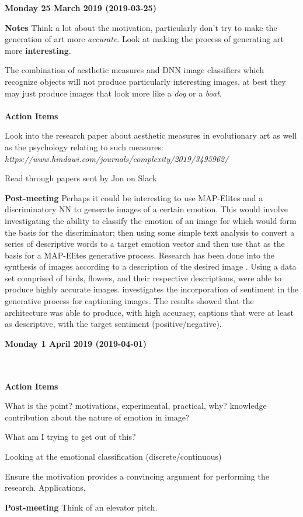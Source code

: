 \documentclass[10pt,a4paper]{article}
\begin{document}
	\begin{center} \textbf{Monday 25 March 2019 (2019-03-25)} \end{center} 
	
	\textbf{Notes}
	Think a lot about the motivation, particularly don't try to make the generation of art more \textit{accurate}. Look at making the process of generating art more \textbf{interesting}.
	
	The combination of aesthetic measures and DNN image classifiers which recognize objects will not produce particularly interesting images, at best they may just produce images that look more like a \textit{dog} or a \textit{boat}.
	\\\\
	\textbf{Action Items}
	\begin{todolist}
		\item Look into the research paper about aesthetic measures in evolutionary art as well as the psychology relating to such measures:\\
		\textit{https://www.hindawi.com/journals/complexity/2019/3495962/}
		\item Read through papers sent by Jon on Slack
	\end{todolist}
	\textbf{Post-meeting}
	Perhaps it could be interesting to use MAP-Elites and a discriminatory NN to generate images of a certain emotion. This would involve investigating the ability to classify the emotion of an image for which would form the basis for the discriminator; then using some simple text analysis to convert a series of descriptive words to a target emotion vector and then use that as the basis for a MAP-Elites generative process.
	Research has been done into the synthesis of images according to a description of the desired image \citep{reed2016generative}.
	Using a data set comprised of birds, flowers, and their respective descriptions, \citet{reed2016generative} were able to produce highly accurate images.
	\citet{mathews2016senticap} investigates the incorporation of sentiment in the generative process for captioning images.
	The results showed that the architecture was able to produce, with high accuracy, captions that were at least as descriptive, with the target sentiment (positive/negative).
	
	\begin{center} \textbf{Monday 1 April 2019 (2019-04-01)} \end{center} 
	
	\\\\
	\textbf{Action Items}
	\begin{todolist}
		\item What is the point? motivations, experimental, practical, why? knowledge contribution about the nature of emotion in image?
		\item What am I trying to get out of this? 
		\item Looking at the emotional classification (discrete/continuous)
		\item Ensure the motivation provides a convincing argument for performing the research.
		Applications, 
	\end{todolist}
	\textbf{Post-meeting}
	Think of an elevator pitch.
	
\end{document}
